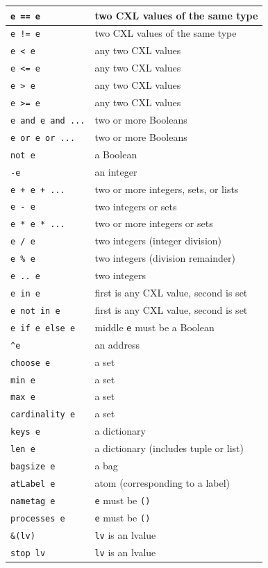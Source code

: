 \documentclass{report}
\begin{document}
\vspace{1em}
\begin{tabular}{|l|l|}
\hline
\texttt{e == e} & two CXL values of the same type \\
\hline
\texttt{e != e} & two CXL values of the same type \\
\hline
\texttt{e < e} & any two CXL values \\
\hline
\texttt{e <= e} & any two CXL values \\
\hline
\texttt{e > e} & any two CXL values \\
\hline
\texttt{e >= e} & any two CXL values \\
\hline
\texttt{e and e and ...} & two or more Booleans \\
\hline
\texttt{e or e or ...} & two or more Booleans \\
\hline
\texttt{not e} & a Boolean \\
\hline
\texttt{-e} & an integer \\
\hline
\texttt{e + e + ...} & two or more integers, sets, or lists \\
\hline
\texttt{e - e} & two integers or sets \\
\hline
\texttt{e * e * ...} & two or more integers or sets \\
\hline
\texttt{e / e} & two integers (integer division) \\
\hline
\texttt{e \% e} & two integers (division remainder) \\
\hline
\texttt{e~..~e} & two integers \\
\hline
\texttt{e in e} & first is any CXL value, second is set \\
\hline
\texttt{e not in e} & first is any CXL value, second is set \\
\hline
\texttt{e if e else e} & middle \texttt{e} must be a Boolean \\
\hline
\texttt{\^{}e} & an address \\
\hline
\texttt{choose e} & a set \\
\hline
\texttt{min e} & a set \\
\hline
\texttt{max e} & a set \\
\hline
\texttt{cardinality e} & a set \\
\hline
\texttt{keys e} & a dictionary \\
\hline
\texttt{len e} & a dictionary (includes tuple or list) \\
\hline
\texttt{bagsize e} & a bag \\
\hline
\texttt{atLabel e} & atom (corresponding to a label) \\
\hline
\texttt{nametag e} & \texttt{e} must be \texttt{()} \\
\hline
\texttt{processes e} & \texttt{e} must be \texttt{()} \\
\hline
\texttt{\&(lv)} & \texttt{lv} is an lvalue \\
\hline
\texttt{stop lv} & \texttt{lv} is an lvalue \\
\hline
\end{tabular}
\vspace{1em}
\end{document}
